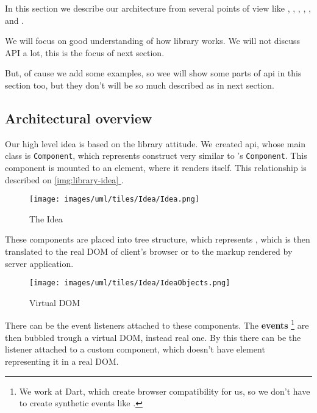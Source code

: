 \documentclass[oneside, 12pt]{book}
\newcommand*{\fullref}[1]{\hyperref[{#1}]{\autoref*{#1} \nameref*{#1}}}
\begin{document}
  In this section we describe our architecture from several points of view like 
	, 
  , 
  , 
  , 
  , 
   and
  .

  We will focus on good understanding of how library works. 
  We will not discuss API a lot, this is the focus of next section. 

  But, of cause we add some examples, so wee will show some parts of api in this section too, 
  but they don't will be so much described as in next section.

  \subsection{Architectural overview}\label{subsec:our-architecture-overview}
		Our high level idea is based on the \facebook \react library attitude. 
    We created api, whose main class is \texttt{Component}, which represents construct very similar to \react's \texttt{Component}.
    This component is mounted to an element, where it renders itself. 
    This relationship is described on \fullref{img:library-idea}.
    \begin{figure}[h]
    \centering  
      \texttt{[image: images/uml/tiles/Idea/Idea.png]}
      \caption{The Idea}
      \label{img:library-idea}
    \end{figure}

    These components are placed into tree structure, which represents \mbox{\textbf{}}, 
    which is then translated to the real DOM of client's browser or to the markup rendered by server application.

    \begin{figure}[h]
    \centering  
      \texttt{[image: images/uml/tiles/Idea/IdeaObjects.png]}
      \caption{Virtual DOM}
      \label{img:library-idea-virtual-dom}
    \end{figure}
    There can be the event listeners attached to these components. 
    The \textbf{events} 
		\footnote{We work at Dart, which create browser compatibility for us, so we don't have to create synthetic events like \react.}
    are then bubbled trough a virtual DOM, instead real one.
    By this there can be the listener attached to a custom component, which doesn't have element representing it in a real DOM.
\end{document}
